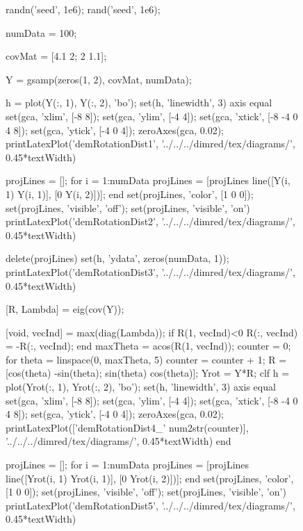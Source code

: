 \begin{figure}
  \begin{octave}
    randn('seed', 1e6);
    rand('seed', 1e6);

    numData = 100;

    covMat = [4.1 2; 2 1.1];


    Y = gsamp(zeros(1, 2), covMat, numData);

    h = plot(Y(:, 1), Y(:, 2), 'bo');
    set(h, 'linewidth', 3)
    axis equal
    set(gca, 'xlim', [-8 8]);
    set(gca, 'ylim', [-4 4]);
    set(gca, 'xtick', [-8 -4 0 4 8]);
    set(gca, 'ytick', [-4 0 4]);
    zeroAxes(gca, 0.02);
    printLatexPlot('demRotationDist1', '../../../dimred/tex/diagrams/', 0.45*textWidth)

    projLines = [];
    for i = 1:numData
      projLines = [projLines line([Y(i, 1) Y(i, 1)], [0 Y(i, 2)])];
    end
    set(projLines, 'color', [1 0 0]);
    set(projLines, 'visible', 'off');
    set(projLines, 'visible', 'on')
    printLatexPlot('demRotationDist2', '../../../dimred/tex/diagrams/', 0.45*textWidth)

    delete(projLines)
    set(h, 'ydata', zeros(numData, 1));
    printLatexPlot('demRotationDist3', '../../../dimred/tex/diagrams/', 0.45*textWidth)

    [R, Lambda] = eig(cov(Y));

    [void, vecInd] = max(diag(Lambda));
    if R(1, vecInd)<0
      R(:, vecInd) = -R(:, vecInd);
    end
    maxTheta = acos(R(1, vecInd));
    counter = 0;
    for theta = linspace(0, maxTheta, 5)
      counter = counter + 1;
      R = [cos(theta) -sin(theta); sin(theta) cos(theta)];
      Yrot = Y*R;
      clf
      h = plot(Yrot(:, 1), Yrot(:, 2), 'bo');
      set(h, 'linewidth', 3)
      axis equal
      set(gca, 'xlim', [-8 8]);
      set(gca, 'ylim', [-4 4]);
      set(gca, 'xtick', [-8 -4 0 4 8]);
      set(gca, 'ytick', [-4 0 4]);
      zeroAxes(gca, 0.02);
      printLatexPlot(['demRotationDist4_' num2str(counter)], '../../../dimred/tex/diagrams/', 0.45*textWidth)
    end

    projLines = [];
    for i = 1:numData
      projLines = [projLines line([Yrot(i, 1) Yrot(i, 1)], [0 Yrot(i, 2)])];
    end
    set(projLines, 'color', [1 0 0]);
    set(projLines, 'visible', 'off');
    set(projLines, 'visible', 'on')
    printLatexPlot('demRotationDist5', '../../../dimred/tex/diagrams/', 0.45*textWidth)


\end{octave}
\end{figure}
